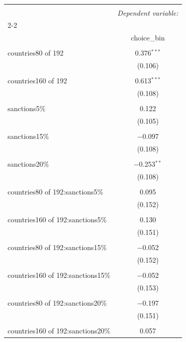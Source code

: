 
\begin{table}[H] \centering 
  \caption{} 
  \label{} 
\begin{tabular}{@{\extracolsep{5pt}}lc} 
\\[-1.8ex]\hline 
\hline \\[-1.8ex] 
 & \multicolumn{1}{c}{\textit{Dependent variable:}} \\ 
\cline{2-2} 
\\[-1.8ex] & choice\_bin \\ 
\hline \\[-1.8ex] 
 countries80 of 192 & 0.376$^{***}$ \\ 
  & (0.106) \\ 
  & \\ 
 countries160 of 192 & 0.613$^{***}$ \\ 
  & (0.108) \\ 
  & \\ 
 sanctions5\% & 0.122 \\ 
  & (0.105) \\ 
  & \\ 
 sanctions15\% & $-$0.097 \\ 
  & (0.108) \\ 
  & \\ 
 sanctions20\% & $-$0.253$^{**}$ \\ 
  & (0.108) \\ 
  & \\ 
 countries80 of 192:sanctions5\% & 0.095 \\ 
  & (0.152) \\ 
  & \\ 
 countries160 of 192:sanctions5\% & 0.130 \\ 
  & (0.151) \\ 
  & \\ 
 countries80 of 192:sanctions15\% & $-$0.052 \\ 
  & (0.152) \\ 
  & \\ 
 countries160 of 192:sanctions15\% & $-$0.052 \\ 
  & (0.153) \\ 
  & \\ 
 countries80 of 192:sanctions20\% & $-$0.197 \\ 
  & (0.151) \\ 
  & \\ 
 countries160 of 192:sanctions20\% & 0.057 \\ 

\end{tabular}
\end{table}
